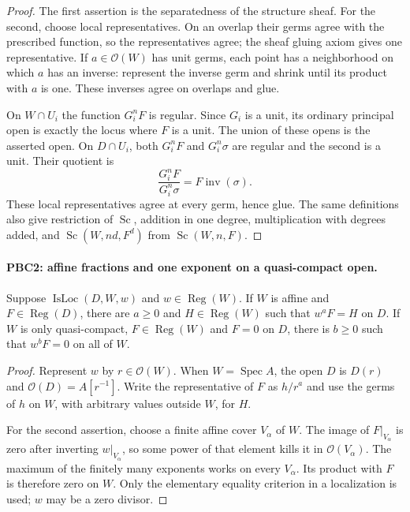 \documentclass[11pt,a4paper]{article}
\numberwithin{equation}{section}
\theoremstyle{remark}\newtheorem{remark}[theorem]{Remark}
\begin{document}
\begin{proof}
The first assertion is the separatedness of the structure sheaf.
For the second, choose local representatives.  On an overlap their
germs agree with the prescribed function, so the representatives agree;
the sheaf gluing axiom gives one representative.  If $a\in\mathcal O(W)$
has unit germs, each point has a neighborhood on which $a$ has an
inverse: represent the inverse germ and shrink until its product with
$a$ is one.  These inverses agree on overlaps and glue.

On $W\cap U_i$ the function $G_i^nF$ is regular.  Since $G_i$ is a
unit, its ordinary principal open is exactly the locus where $F$ is
a unit.  The union of these opens is the asserted open.  On
$D\cap U_i$, both $G_i^nF$ and $G_i^n\sigma$ are regular and the
second is a unit.  Their quotient is
\[
 \frac{G_i^nF}{G_i^n\sigma}=F\operatorname{inv}(\sigma).
\]
These local representatives agree at every germ, hence glue.
The same definitions also give restriction of $\operatorname{Sc}$,
addition in one degree, multiplication with degrees added, and
$\operatorname{Sc}(W,nd,F^d)$ from
$\operatorname{Sc}(W,n,F)$.
\end{proof}

\paragraph{PBC2: affine fractions and one exponent on a quasi-compact open.}
\label{claim:PBC2}
Suppose $\operatorname{IsLoc}(D,W,w)$ and
$w\in\operatorname{Reg}(W)$.  If $W$ is affine and
$F\in\operatorname{Reg}(D)$, there are $a\ge0$ and
$H\in\operatorname{Reg}(W)$ such that
$w^aF=H$ on $D$.  If $W$ is only quasi-compact,
$F\in\operatorname{Reg}(W)$ and $F=0$ on $D$, there is $b\ge0$
such that $w^bF=0$ on all of $W$.

\begin{proof}
Represent $w$ by $r\in\mathcal O(W)$.  When $W=\operatorname{Spec}A$,
the open $D$ is $D(r)$ and
$\mathcal O(D)=A[r^{-1}]$.  Write the representative of $F$ as
$h/r^a$ and use the germs of $h$ on $W$, with arbitrary values
outside $W$, for $H$.

For the second assertion, choose a finite affine cover $V_\alpha$
of $W$.  The image of $F|_{V_\alpha}$ is zero after inverting
$w|_{V_\alpha}$, so some power of that element kills it in
$\mathcal O(V_\alpha)$.  The maximum of the finitely many exponents
works on every $V_\alpha$.  Its product with $F$ is therefore zero
on $W$.  Only the elementary equality criterion in a localization
is used; $w$ may be a zero divisor.
\end{proof}
\end{document}
